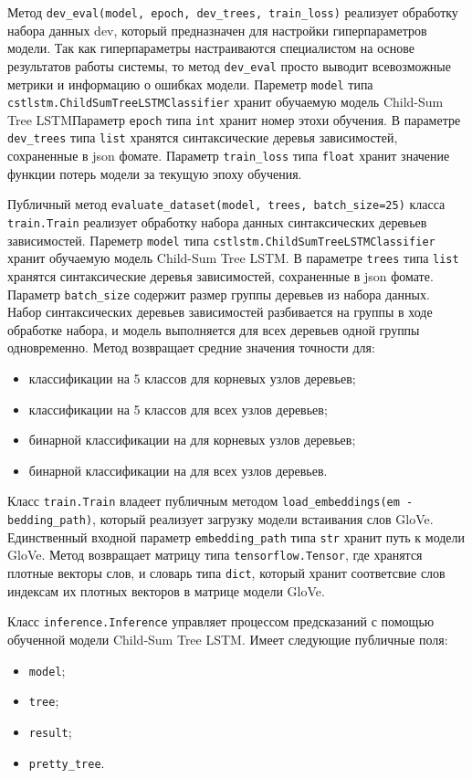 Метод \texttt{dev\_eval(model, epoch, dev\_trees, train\_loss)} реализует обработку набора данных dev, который предназначен для настройки гиперпараметров модели. Так как гиперпараметры настраиваются специалистом на основе результатов работы системы, то метод \texttt{dev\_eval} просто выводит всевозможные метрики и информацию о ошибках модели. Пареметр \texttt{model} типа \texttt{cstlstm.ChildSumTreeLSTMClassifier} хранит обучаемую модель Child-Sum Tree LSTM\@ Параметр \texttt{epoch} типа \texttt{int} хранит номер этохи обучения. В параметре \texttt{dev\_trees} типа \texttt{list} хранятся синтаксические деревья зависимостей, сохраненные в json фомате. Параметр \texttt{train\_loss} типа \texttt{float} хранит значение функции потерь модели за текущую эпоху обучения.

Публичный метод \texttt{evaluate\_dataset(model, trees, batch\_size=25)} класса \texttt{train.Train} реализует обработку набора данных синтаксических деревьев зависимостей. Пареметр \texttt{model} типа \texttt{cstlstm.ChildSumTreeLSTMCla\-ssifier} хранит обучаемую модель Child-Sum Tree LSTM\@. В параметре \texttt{trees} типа \texttt{list} хранятся синтаксические деревья зависимостей, сохраненные в json фомате. Параметр \texttt{batch\_size} содержит размер группы деревьев из набора данных. Набор синтаксических деревьев зависимостей разбивается на группы в ходе обработке набора, и модель выполняется для всех деревьев одной группы одновременно. Метод возвращает средние значения точности для:
\begin{itemize}
\item классификации на 5 классов для корневых узлов деревьев;
\item классификации на 5 классов для всех узлов деревьев;
\item бинарной классификации на для корневых узлов деревьев;
\item бинарной классификации на для всех узлов деревьев.
\end{itemize}

Класс \texttt{train.Train} владеет публичным методом \texttt{load\_embeddings(em
  -bedding\_path)}, который реализует загрузку модели встаивания слов GloVe. Единственный входной параметр \texttt{embedding\_path} типа \texttt{str} хранит путь к модели GloVe. Метод возвращает матрицу типа \texttt{tensorflow.Tensor}, где хранятся плотные векторы слов, и словарь типа \texttt{dict}, который хранит соответсвие слов индексам их плотных векторов в матрице модели GloVe.

Класс \texttt{inference.Inference} управляет процессом предсказаний с помощью обученной модели Child-Sum Tree LSTM\@. Имеет следующие публичные поля:
\begin{itemize}
\item \texttt{model};
\item \texttt{tree};
\item \texttt{result};
\item \texttt{pretty\_tree}.
\end{itemize}


